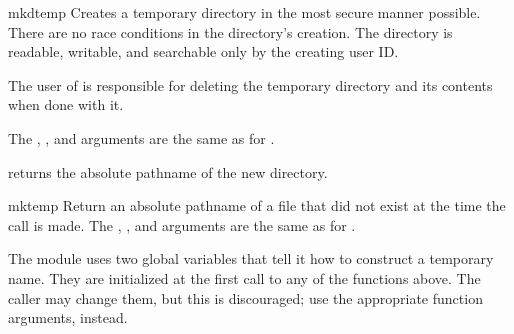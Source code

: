 \begin{funcdesc}{mkdtemp}{}
Creates a temporary directory in the most secure manner possible.
There are no race conditions in the directory's creation.  The
directory is readable, writable, and searchable only by the
creating user ID.

The user of  is responsible for deleting the
temporary directory and its contents when done with it.

The , , and  arguments are the same
as for .

 returns the absolute pathname of the new directory.
\end{funcdesc}

\begin{funcdesc}{mktemp}{}
Return an absolute pathname of a file that did not exist at the time
the call is made.  The , , and 
arguments are the same as for .

\end{funcdesc}

The module uses two global variables that tell it how to construct a
temporary name.  They are initialized at the first call to any of the
functions above.  The caller may change them, but this is discouraged;
use the appropriate function arguments, instead.

